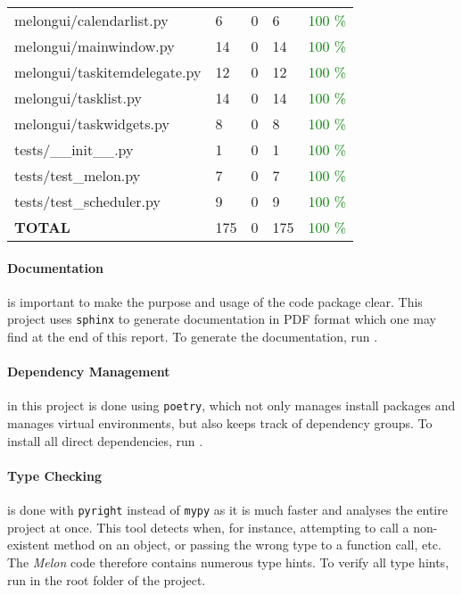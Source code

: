 \begin{table}
\begin{tabular}{lllll}
    melongui/calendarlist.py        & 6         & 0        & 6         & \textcolor{green}{100 \%} \\
    melongui/mainwindow.py          & 14        & 0        & 14        & \textcolor{green}{100 \%} \\
    melongui/taskitemdelegate.py    & 12        & 0        & 12        & \textcolor{green}{100 \%} \\
    melongui/tasklist.py            & 14        & 0        & 14        & \textcolor{green}{100 \%} \\
    melongui/taskwidgets.py         & 8         & 0        & 8         & \textcolor{green}{100 \%} \\
    tests/\_\_init\_\_.py           & 1         & 0        & 1         & \textcolor{green}{100 \%} \\
    tests/test\_melon.py            & 7         & 0        & 7         & \textcolor{green}{100 \%} \\
    tests/test\_scheduler.py        & 9         & 0        & 9         & \textcolor{green}{100 \%} \\
    \hline
    \bf TOTAL                       & 175       & 0        & 175       & \textcolor{green}{100 \%} \\
    \hline
  \end{tabular}
  \label{table:interrogate}
\end{table}

\paragraph{Documentation} is important to make the purpose and usage of the code package clear. This project uses \texttt{sphinx} to generate documentation in PDF format which one may find at the end of this report. To generate the documentation, run .

\paragraph{Dependency Management} in this project is done using \texttt{poetry}, which not only manages install packages and manages virtual environments, but also keeps track of dependency groups.
To install all direct dependencies, run .

\paragraph{Type Checking} is done with \texttt{pyright} instead of \texttt{mypy} as it is much faster and analyses the entire project at once. This tool detects when, for instance, attempting to call a non-existent method on an object, or passing the wrong type to a function call, etc.
The \textit{Melon} code therefore contains numerous type hints.
To verify all type hints, run  in the root folder of the project.


